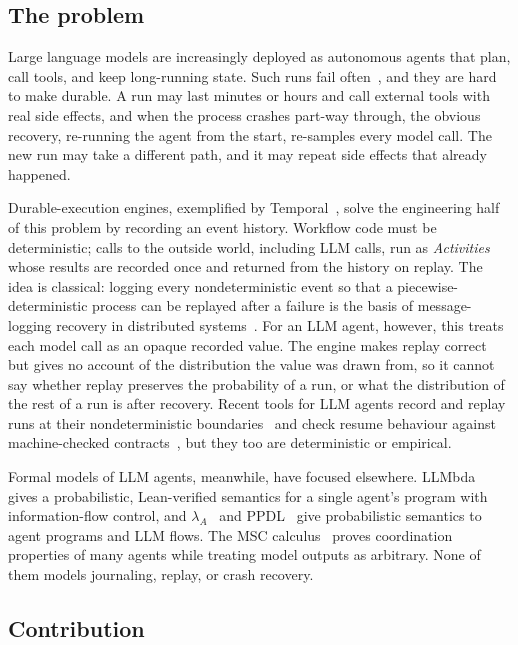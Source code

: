 
\subsection*{The problem}

Large language models are increasingly deployed as autonomous agents that plan, call tools,
and keep long-running state.
Such runs fail often~\citep{cemri2025mast}, and they are hard to make durable.
A run may last minutes or hours and call external tools with real side effects, and when the
process crashes part-way through, the obvious recovery, re-running the agent from the start,
re-samples every model call.
The new run may take a different path, and it may repeat side effects that already happened.

Durable-execution engines, exemplified by Temporal~\citep{temporal2024docs}, solve the
engineering half of this problem by recording an event history.
Workflow code must be deterministic; calls to the outside world, including LLM calls, run as
\emph{Activities} whose results are recorded once and returned from the history on replay.
The idea is classical: logging every nondeterministic event so that a piecewise-deterministic
process can be replayed after a failure is the basis of message-logging recovery in
distributed systems~\citep{strom1985optimistic,elnozahy2002survey}.
For an LLM agent, however, this treats each model call as an opaque recorded value.
The engine makes replay correct but gives no account of the distribution the value was drawn
from, so it cannot say whether replay preserves the probability of a run, or what the
distribution of the rest of a run is after recovery.
Recent tools for LLM agents record and replay runs at their nondeterministic
boundaries~\citep{mudasiru2026agrepl,chawla2026chronicle} and check resume behaviour against
machine-checked contracts~\citep{khan2026resume,zheng2026execedits}, but they too are
deterministic or empirical.

Formal models of LLM agents, meanwhile, have focused elsewhere.
LLMbda~\citep{garby2026llmbda} gives a probabilistic, Lean-verified semantics for a single
agent's program with information-flow control, and $\lambda_A$~\citep{liu2026lambdaA} and
PPDL~\citep{mandel2026ppdl} give probabilistic semantics to agent programs and LLM flows.
The MSC calculus~\citep{bollig2026msc} proves coordination properties of many agents while
treating model outputs as arbitrary.
None of them models journaling, replay, or crash recovery.

\subsection*{Contribution}

